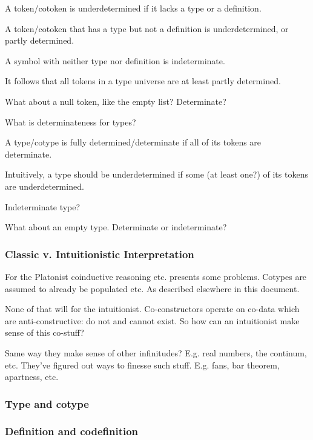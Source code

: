 \documentclass{article}
\begin{document}
A token/cotoken is underdetermined if it lacks a type or a definition.

A token/cotoken that has a type but not a definition is
underdetermined, or partly determined.

A symbol with neither type nor definition is indeterminate.

It follows that all tokens in a type universe are at least partly
determined.

What about a null token, like the empty list? Determinate?

What is determinateness for types?

A type/cotype is fully determined/determinate if all of its tokens are
determinate.

Intuitively, a type should be underdetermined if some (at least one?)
of its tokens are underdetermined.

Indeterminate type?

What about an empty type. Determinate or indeterminate?

\subsubsection{Classic v. Intuitionistic Interpretation}

For the Platonist coinductive reasoning etc. presents some problems.
Cotypes are assumed to already be populated etc.  As described elsewhere in this document.

None of that will for the intuitionist. Co-constructors operate on
co-data which are anti-constructive: do not and cannot exist. So how
can an intuitionist make sense of this co-stuff?

Same way they make sense of other infinitudes? E.g. real numbers, the
continum, etc. They've figured out ways to finesse such stuff. E.g.
fans, bar theorem, apartness, etc.

\subsubsection{Type and cotype}

\subsubsection{Definition and codefinition}

\end{document}
